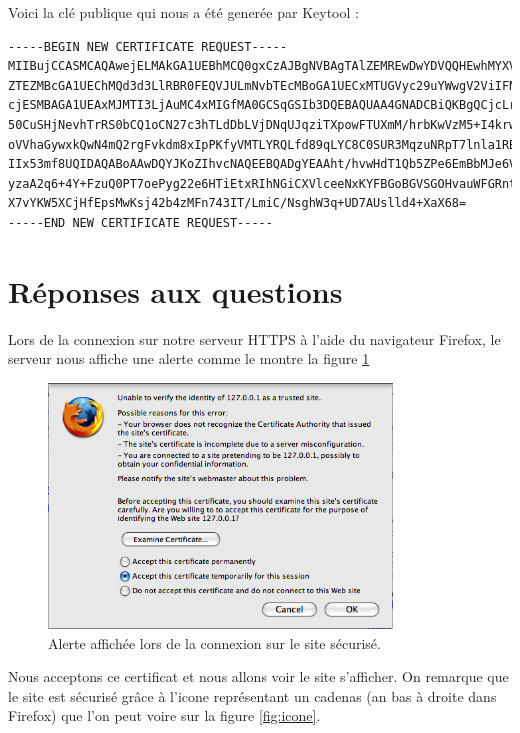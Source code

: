 \documentclass[10pt,a4paper,titlepage]{article}
\begin{document}
Voici la clé publique qui nous a été generée par Keytool :

\scriptsize{
\begin{verbatim}
-----BEGIN NEW CERTIFICATE REQUEST-----
MIIBujCCASMCAQAwejELMAkGA1UEBhMCQ0gxCzAJBgNVBAgTAlZEMREwDwYDVQQHEwhMYXVzYW5u
ZTEZMBcGA1UEChMQd3d3LlRBR0FEQVJULmNvbTEcMBoGA1UECxMTUGVyc29uYWwgV2ViIFNlcnZl
cjESMBAGA1UEAxMJMTI3LjAuMC4xMIGfMA0GCSqGSIb3DQEBAQUAA4GNADCBiQKBgQCjcLrCVl/h
50CuSHjNevhTrRS0bCQ1oCN27c3hTLdDbLVjDNqUJqziTXpowFTUXmM/hrbKwVzM5+I4krwx/6dW
oVVhaGywxkQwN4mQ2rgFvkdm8xIpPKfyVMTLYRQLfd89qLYC8C0SUR3MqzuNRpT7lnla1RB9A6Mg
IIx53mf8UQIDAQABoAAwDQYJKoZIhvcNAQEEBQADgYEAAht/hvwHdT1Qb5ZPe6EmBbMJe6VozqQT
yzaA2q6+4Y+FzuQ0PT7oePyg22e6HTiEtxRIhNGiCXVlceeNxKYFBGoBGVSGOHvauWFGRntErntQ
X7vYKW5XCjHfEpsMwKsj42b4zMFn743IT/LmiC/NsghW3q+UD7AUslld4+XaX68=
-----END NEW CERTIFICATE REQUEST-----
\end{verbatim}
}

\section{Réponses aux questions}

Lors de la connexion sur notre serveur HTTPS à l'aide du navigateur Firefox, le serveur nous affiche une alerte comme le montre la figure \ref{fig:connex}

\begin{figure}[htbp]
   \begin{center}
      \includegraphics[width=345px]{img/1.png}
   \end{center}
   \caption{Alerte affichée lors de la connexion sur le site sécurisé.}
	\label{fig:connex}
\end{figure}

Nous acceptons ce certificat et nous allons voir le site s'afficher. On remarque que le site est sécurisé grâce à l'icone représentant un cadenas (an bas à droite dans Firefox) que l'on peut voire sur la figure \ref{fig:icone}.
\end{document}
